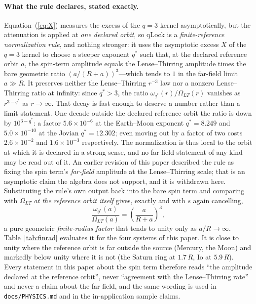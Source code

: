 \documentclass[aps,reprint,amsmath,amssymb,nofootinbib,superscriptaddress,floatfix]{revtex4-2}
\begin{document}
\paragraph*{What the rule declares, stated exactly.}
Equation~(\ref{eq:X}) measures the excess of the $q=3$ kernel
asymptotically, but the attenuation is applied at \emph{one declared
orbit}, so qLock is a \emph{finite-reference normalization rule}, and
nothing stronger: it uses the asymptotic excess $X$ of the $q=3$ kernel
to choose a steeper exponent $q^{*}$ such that, at the declared
reference orbit $a$, the spin-term amplitude equals the Lense--Thirring
amplitude times the bare geometric ratio $(a/(R+a))^{3}$---which tends
to $1$ in the far-field limit $a\gg R$.
It preserves neither the Lense--Thirring $r^{-3}$ law nor a nonzero
Lense--Thirring ratio at infinity: since $q^{*}>3$, the ratio
$\omega_{q^{*}}(r)/\Omega_{LT}(r)$ vanishes as $r^{3-q^{*}}$ as
$r\to\infty$.
That decay is fast enough to deserve a number rather than a limit
statement.
One decade outside the declared reference orbit the ratio is down by
$10^{3-q^{*}}$: a factor $5.6\times10^{-6}$ at the Earth--Moon exponent
$q^{*}=8.249$ and $5.0\times10^{-10}$ at the Jovian $q^{*}=12.302$;
even moving out by a factor of two costs $2.6\times10^{-2}$ and
$1.6\times10^{-3}$ respectively.
The normalization is thus local to the orbit at which it is declared in
a strong sense, and no far-field statement of any kind may be read out
of it.
An earlier revision of this paper described the rule as fixing the spin
term's \emph{far-field} amplitude at the Lense--Thirring scale; that is
an asymptotic claim the algebra does not support, and it is withdrawn
here.
Substituting the rule's own output back into the bare spin term and
comparing with $\Omega_{LT}$ \emph{at the reference orbit itself} gives,
exactly and with $s$ again cancelling,
\begin{equation}
  \frac{\omega_{q^{*}}(a)}{\Omega_{LT}(a)}
    = \left(\frac{a}{R+a}\right)^{3},
  \label{eq:finrad}
\end{equation}
a pure geometric \emph{finite-radius factor} that tends to unity only as
$a/R\to\infty$.
Table~\ref{tab:finrad} evaluates it for the four systems of this paper.
It is close to unity where the reference orbit is far outside the
source (Mercury, the Moon) and markedly below unity where it is not
(the Saturn ring at $1.7\,R$, Io at $5.9\,R$).
Every statement in this paper about the spin term therefore reads
``the amplitude declared at the reference orbit'', never ``agreement
with the Lense--Thirring rate'' and never a claim about the far field,
and the same wording is used in \texttt{docs/PHYSICS.md} and in the
in-application sample claims.
\end{document}
